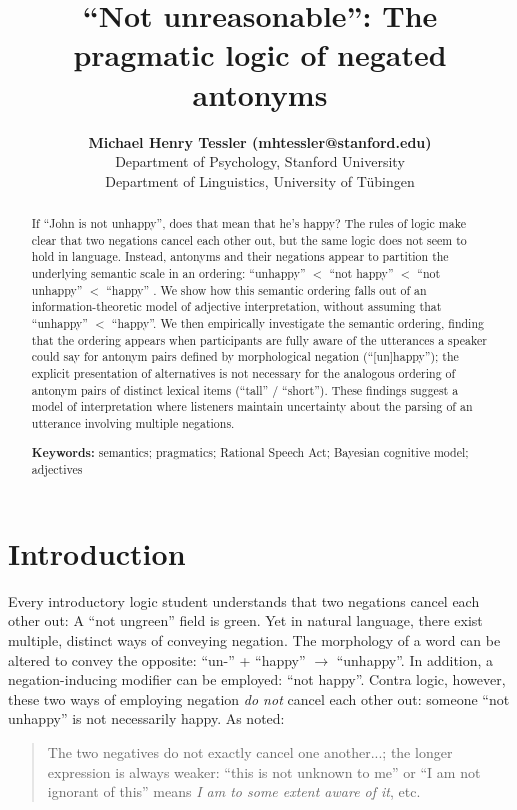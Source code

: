 \documentclass[10pt,letterpaper]{article}
\title{``Not unreasonable'': The pragmatic logic of negated antonyms}
\author{{\large \bf Michael Henry Tessler (mhtessler@stanford.edu)} \\
  Department of Psychology, Stanford University 
  \AND {\large \bf Michael Franke (mchfranke@gmail.com)} \\
  Department of Linguistics, University of T\"{u}bingen}
\begin{document}
\maketitle


\begin{abstract}

If ``John is not unhappy'', does that mean that he's happy? 
The rules of logic make clear that two negations cancel each other out, but the same logic does not seem to hold in language. 
Instead, antonyms and their negations appear to partition the underlying semantic scale in an ordering: ``unhappy'' $<$ ``not happy'' $<$ ``not unhappy'' $<$ ``happy'' \cite{Horn1989:Natural, Krifka2007:Negated-antonyms}. 
We show how this semantic ordering falls out of an information-theoretic model of adjective interpretation, without assuming that ``unhappy'' $<$ ``happy''.
We then empirically investigate the semantic ordering, finding that the ordering appears when participants are fully aware of the utterances a speaker could say for antonym pairs defined by morphological negation (``[un]happy''); the explicit presentation of alternatives is not necessary for the analogous ordering of antonym pairs of distinct lexical items (``tall'' / ``short''). 
These findings suggest a model of interpretation where listeners maintain uncertainty about the parsing of an utterance involving multiple negations.


\textbf{Keywords:} 
semantics; pragmatics; Rational Speech Act; Bayesian cognitive model; adjectives
\end{abstract}


\section{Introduction}

Every introductory logic student understands that two negations cancel each other out: A ``not ungreen'' field is green.
Yet in natural language, there exist multiple, distinct ways of conveying negation.  
The morphology of a word can be altered to convey the opposite: ``un-'' + ``happy'' $\rightarrow$ ``unhappy''.
In addition, a negation-inducing modifier can be employed: ``not happy''.
Contra logic, however, these two ways of employing negation \emph{do not} cancel each other out: someone ``not unhappy'' is not necessarily happy. 	
As  noted:
%
\begin{quote}
The two negatives do not exactly cancel one another...; the longer expression is always weaker: ``this is not unknown to me'' or ``I am not ignorant of this'' means \emph{I am to some extent aware of it}, etc.
\end{quote}
%
\end{document}
